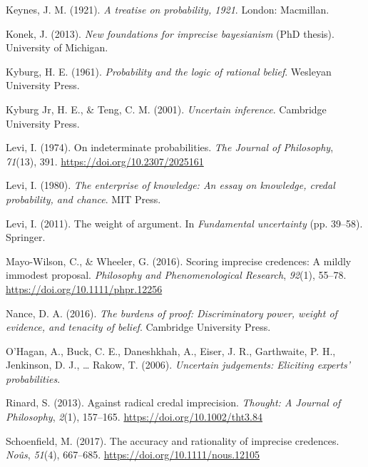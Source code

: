 \documentclass[
  10pt,
  dvipsnames,enabledeprecatedfontcommands]{scrartcl}
\newlength{\cslhangindent}
\newlength{\cslentryspacingunit} %
\newenvironment{CSLReferences}[2] %
 {%
  \setlength{\parindent}{0pt}
  \ifodd #1
  \let\oldpar\par
  \def\par{\hangindent=\cslhangindent\oldpar}
  \fi
  \setlength{\parskip}{#2\cslentryspacingunit}
 }%
 {}
\begin{document}
\begin{CSLReferences}{1}{0}
\leavevmode{}%
Keynes, J. M. (1921). \emph{A treatise on probability, 1921}. London:
Macmillan.

\leavevmode{}%
Konek, J. (2013). \emph{New foundations for imprecise bayesianism} (PhD
thesis). University of Michigan.

\leavevmode{}%
Kyburg, H. E. (1961). \emph{Probability and the logic of rational
belief}. Wesleyan University Press.

\leavevmode{}%
Kyburg Jr, H. E., \& Teng, C. M. (2001). \emph{Uncertain inference}.
Cambridge University Press.

\leavevmode{}%
Levi, I. (1974). On indeterminate probabilities. \emph{The Journal of
Philosophy}, \emph{71}(13), 391. \url{https://doi.org/10.2307/2025161}

\leavevmode{}%
Levi, I. (1980). \emph{The enterprise of knowledge: An essay on
knowledge, credal probability, and chance}. MIT Press.

\leavevmode{}%
Levi, I. (2011). The weight of argument. In \emph{Fundamental
uncertainty} (pp. 39--58). Springer.

\leavevmode{}%
Mayo-Wilson, C., \& Wheeler, G. (2016). Scoring imprecise credences: A
mildly immodest proposal. \emph{Philosophy and Phenomenological
Research}, \emph{92}(1), 55--78.
\url{https://doi.org/10.1111/phpr.12256}

\leavevmode{}%
Nance, D. A. (2016). \emph{The burdens of proof: Discriminatory power,
weight of evidence, and tenacity of belief}. Cambridge University Press.

\leavevmode{}%
O'Hagan, A., Buck, C. E., Daneshkhah, A., Eiser, J. R., Garthwaite, P.
H., Jenkinson, D. J., \ldots{} Rakow, T. (2006). \emph{Uncertain
judgements: Eliciting experts' probabilities}.

\leavevmode{}%
Rinard, S. (2013). Against radical credal imprecision. \emph{Thought: A
Journal of Philosophy}, \emph{2}(1), 157--165.
\url{https://doi.org/10.1002/tht3.84}

\leavevmode{}%
Schoenfield, M. (2017). The accuracy and rationality of imprecise
credences. \emph{Noûs}, \emph{51}(4), 667--685.
\url{https://doi.org/10.1111/nous.12105}


\end{CSLReferences}
\end{document}
